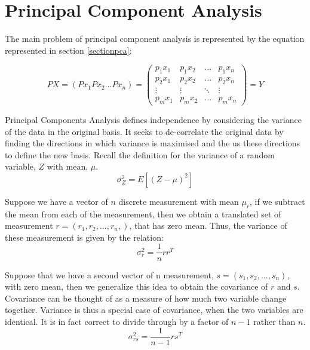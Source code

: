 \begin{appendix}
\begin{itemize}
\end{itemize}





\chapter{Principal Component Analysis}
\label{appendixpca}
The main problem of principal component analysis is represented by the equation represented in section \ref{sectionpca}:

\begin{equation*}
PX = (Px_{1} Px_{2} \ldots Px_{n})
=
\begin{pmatrix}
    p_{1}x_{1} & p_{1}x_{2}  & \dots  & p_{1}x_{n} \\
    p_{2}x_{1} & p_{2}x_{2}  & \dots  & p_{2}x_{n} \\
    \vdots & \vdots  & \ddots & \vdots \\
    p_{m}x_{1} & p_{m}x_{2}  & \dots  & p_{m}x_{n}
\end{pmatrix}
=
Y
\end{equation*}

Principal Components Analysis defines independence by considering the variance of the data in the original basis. It seeks to de-correlate the original data by finding the directions in which variance is maximised and the us these directions to define the new basis. Recall the definition for the variance of a random variable, $Z$ with mean, $\mu$.\\
\begin{equation*}
\sigma_{Z}^{2}=E[(Z-\mu )^{2}]
\end{equation*}

Suppose we have a vector of $n$ discrete measurement with mean $\mu_{r}$, if we subtract the mean from each of the measurement, then we obtain a translated set of measurement $r=(r_{1},r_{2},\ldots, r_{n},)$, that has zero mean. Thus, the variance of these measurement is given by the relation:\\
\begin{equation*}
\sigma_{r}^{2}=\frac{1}{n}rr^{T}
\end{equation*}

Suppose that we have a second vector of n measurement, $s = (s_{1}, s_{2}, \ldots ,s_{n})$, with zero mean, then we generalize this idea to obtain the covariance of $r$ and $s$. Covariance can be thought of as a measure of how much two variable change together. Variance is thus a special case of covariance, when the two variables are identical. It is in fact correct to divide through by a factor of $n-1$ rather than $n$.\\
\begin{equation*}
\sigma_{rs}^{2}=\dfrac{1}{n-1}rs^{T}
\end{equation*}


\end{appendix}
